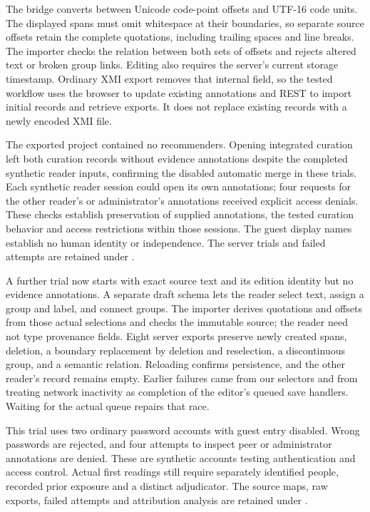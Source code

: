 The bridge converts between Unicode code-point offsets and UTF-16 code units.
The displayed spans must omit whitespace at their boundaries, so separate
source offsets retain the complete quotations, including trailing spaces and
line breaks.
The importer checks the relation between both sets of offsets and rejects
altered text or broken group links. Editing also requires the server's current
storage timestamp. Ordinary XMI export removes that internal field, so the
tested workflow uses the browser to update existing annotations and REST to
import initial records and retrieve exports. It does not replace existing
records with a newly encoded XMI file.

The exported project contained no recommenders. Opening integrated curation
left both curation records without evidence annotations despite the completed
synthetic reader inputs, confirming the disabled automatic merge in these
trials. Each synthetic reader session could open its own annotations; four
requests for the other reader's or administrator's annotations received explicit
access denials. These checks establish preservation of supplied annotations,
the tested curation behavior and access restrictions within those sessions.
The guest display names establish no human identity or independence. The
server trials and failed attempts are retained under
.

A further trial now starts with exact source text and its edition identity but
no evidence annotations. A separate draft schema lets the reader select text,
assign a group and label, and connect groups. The importer derives quotations
and offsets from those actual selections and checks the immutable source; the
reader need not type provenance fields. Eight server exports preserve newly
created spans, deletion, a boundary replacement by deletion and reselection,
a discontinuous group, and a semantic relation. Reloading confirms persistence,
and the other reader's record remains empty. Earlier failures came from our
selectors and from treating network inactivity as completion of the editor's
queued save handlers. Waiting for the actual queue repairs that race.

This trial uses two ordinary password accounts with guest entry disabled.
Wrong passwords are rejected, and four attempts to inspect peer or administrator
annotations are denied. These are synthetic accounts testing authentication and
access control. Actual first readings still require separately identified people,
recorded prior exposure and a distinct adjudicator. The source maps, raw exports,
failed attempts and attribution analysis are retained under
.

